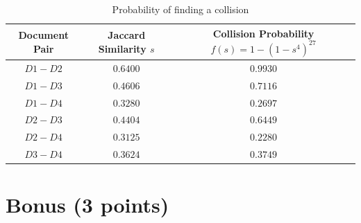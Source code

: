 \documentclass[11pt]{article}
\begin{document}
    \begin{table}[!h] 
    \centering
    \caption{Probability of finding a collision}
    \label{collprob}
    \begin{tabular}{|c|c|c|}
      \hline
   Document Pair & Jaccard Similarity $s$ & Collision Probability $f(s) = 1 - \left ( 1 - s^4 \right ) ^ {27}$   \\
      \hline      
      $D1-D2$ &   $0.6400$              &  $0.9930$   \\
      \hline      
      $D1-D3$ &    $0.4606$             & $0.7116$   \\
      \hline      
      $D1-D4$ &    $0.3280$           &  $0.2697$   \\
      \hline      
      $D2-D3$ &      $0.4404$          &  $0.6449$   \\
      \hline
      $D2-D4$ &      $0.3125$          &  $0.2280$   \\
      \hline
      $D3-D4$ &      $0.3624$          &  $0.3749$   \\
      \hline
    \end{tabular}
    \end{table}

\section{Bonus (3 points)}
\end{document}
